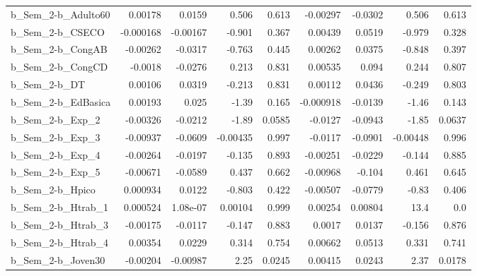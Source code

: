 \begin{tabular}{lrrrrrrrr}
b\_Sem\_2-b\_Adulto60         &     0.00178 &       0.0159 &    0.506 &    0.613 &   -0.00297 &     -0.0302 &        0.506 &         0.613 \\
b\_Sem\_2-b\_CSECO            &   -0.000168 &     -0.00167 &   -0.901 &    0.367 &    0.00439 &      0.0519 &       -0.979 &         0.328 \\
b\_Sem\_2-b\_CongAB           &    -0.00262 &      -0.0317 &   -0.763 &    0.445 &    0.00262 &      0.0375 &       -0.848 &         0.397 \\
b\_Sem\_2-b\_CongCD           &     -0.0018 &      -0.0276 &    0.213 &    0.831 &    0.00535 &       0.094 &        0.244 &         0.807 \\
b\_Sem\_2-b\_DT               &     0.00106 &       0.0319 &   -0.213 &    0.831 &    0.00112 &      0.0436 &       -0.249 &         0.803 \\
b\_Sem\_2-b\_EdBasica         &     0.00193 &        0.025 &    -1.39 &    0.165 &  -0.000918 &     -0.0139 &        -1.46 &         0.143 \\
b\_Sem\_2-b\_Exp\_2            &    -0.00326 &      -0.0212 &    -1.89 &   0.0585 &    -0.0127 &     -0.0943 &        -1.85 &        0.0637 \\
b\_Sem\_2-b\_Exp\_3            &    -0.00937 &      -0.0609 & -0.00435 &    0.997 &    -0.0117 &     -0.0901 &     -0.00448 &         0.996 \\
b\_Sem\_2-b\_Exp\_4            &    -0.00264 &      -0.0197 &   -0.135 &    0.893 &   -0.00251 &     -0.0229 &       -0.144 &         0.885 \\
b\_Sem\_2-b\_Exp\_5            &    -0.00671 &      -0.0589 &    0.437 &    0.662 &   -0.00968 &      -0.104 &        0.461 &         0.645 \\
b\_Sem\_2-b\_Hpico            &    0.000934 &       0.0122 &   -0.803 &    0.422 &   -0.00507 &     -0.0779 &        -0.83 &         0.406 \\
b\_Sem\_2-b\_Htrab\_1          &    0.000524 &     1.08e-07 &  0.00104 &    0.999 &    0.00254 &     0.00804 &         13.4 &           0.0 \\
b\_Sem\_2-b\_Htrab\_3          &    -0.00175 &      -0.0117 &   -0.147 &    0.883 &     0.0017 &      0.0137 &       -0.156 &         0.876 \\
b\_Sem\_2-b\_Htrab\_4          &     0.00354 &       0.0229 &    0.314 &    0.754 &    0.00662 &      0.0513 &        0.331 &         0.741 \\
b\_Sem\_2-b\_Joven30          &    -0.00204 &     -0.00987 &     2.25 &   0.0245 &    0.00415 &      0.0243 &         2.37 &        0.0178 \\

\end{tabular}
